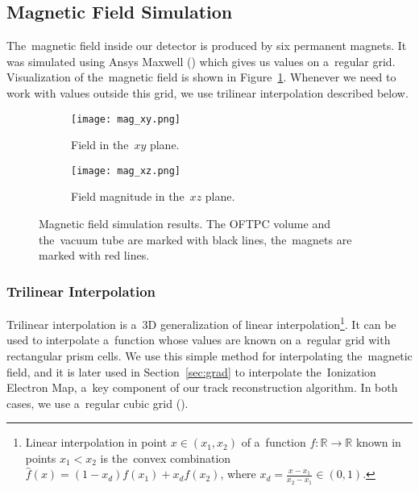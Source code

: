 		\subsection{Magnetic Field Simulation}
		\label{sec:mag}
			The~magnetic field inside our detector is produced by six permanent magnets. It was simulated using Ansys Maxwell () which gives us values on a~regular grid.  Visualization of the~magnetic field is shown in Figure~\ref{fig:mag}. Whenever we need to work with values outside this grid, we use trilinear interpolation described below.
			
			\begin{figure}
				\centering
				\begin{subfigure}[t]{0.45\textwidth}
					\centering
					\texttt{[image: mag\_xy.png]}
					\caption{Field in the~$xy$ plane.}
				\end{subfigure}
				\hfill
				\begin{subfigure}[t]{0.45\textwidth}
					\centering
					\texttt{[image: mag\_xz.png]}
					\caption{Field magnitude in the~$xz$ plane.}
				\end{subfigure}
				\caption{Magnetic field simulation results. The \ac{OFTPC} volume and the~vacuum tube are marked with black lines, the~magnets are marked with red lines. }
				\label{fig:mag}
			\end{figure}
		
			\subsubsection{Trilinear Interpolation}
			\label{sec:trilin}
				Trilinear interpolation is a~3D generalization of linear interpolation\footnote{Linear interpolation in point $x\in(x_1,x_2)$ of a~function $f\colon\mathbb{R}\to\mathbb{R}$ known in points $x_1 < x_2$ is the~convex combination $\widehat{f}(x) = (1-x_d)f(x_1)+x_d f(x_2)$, where $x_d = \frac{x-x_1}{x_2-x_1} \in (0,1)$.}. It can be used to interpolate a~function whose values are known on a~regular grid with rectangular prism cells. We use this simple method for interpolating the~magnetic field, and it is later used in Section~\ref{sec:grad} to interpolate the~Ionization Electron Map, a~key component of our track reconstruction algorithm. In both cases, we use a~regular cubic grid ().
				
